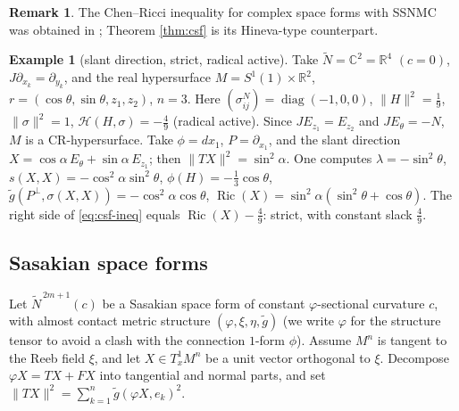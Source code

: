 \documentclass[11pt]{article}
\theoremstyle{definition}
\newtheorem{remark}[theorem]{Remark}
\newtheorem{example}[theorem]{Example}
\newcommand{\tN}{\widetilde{N}}
\newcommand{\tg}{\widetilde{g}}
\newcommand{\Ric}{\operatorname{Ric}}
\newcommand{\HH}{\mathcal{H}}
\begin{document}
\begin{remark}\label{rem:csf-hist}
The Chen--Ricci inequality for complex space forms with SSNMC was obtained in \cite{Moh1}; Theorem \ref{thm:csf} is its Hineva-type counterpart.
\end{remark}

\begin{example}[slant direction, strict, radical active]\label{ex:complex}
Take $\tN=\mathbb{C}^2=\mathbb{R}^4$ $(c=0)$, $J\partial_{x_k}=\partial_{y_k}$, and the real hypersurface $M=S^1(1)\times\mathbb{R}^2$, $r=(\cos\theta,\sin\theta,z_1,z_2)$, $n=3$. Here $(\sigma^N_{ij})=\operatorname{diag}(-1,0,0)$, $\|H\|^2=\tfrac19$, $\|\sigma\|^2=1$, $\HH(H,\sigma)=-\tfrac49$ (radical active). Since $JE_{z_1}=E_{z_2}$ and $JE_\theta=-N$, $M$ is a CR-hypersurface. Take $\phi=dx_1$, $P=\partial_{x_1}$, and the slant direction $X=\cos\alpha\,E_\theta+\sin\alpha\,E_{z_1}$; then $\|TX\|^2=\sin^2\alpha$. One computes $\lambda=-\sin^2\theta$, $s(X,X)=-\cos^2\alpha\sin^2\theta$, $\phi(H)=-\tfrac13\cos\theta$, $\tg(P^\perp,\sigma(X,X))=-\cos^2\alpha\cos\theta$, $\Ric(X)=\sin^2\alpha(\sin^2\theta+\cos\theta)$. The right side of \eqref{eq:csf-ineq} equals $\Ric(X)-\tfrac49$: strict, with constant slack $\tfrac49$.
\end{example}

\subsection{Sasakian space forms}

Let $\tN^{\,2m+1}(c)$ be a Sasakian space form of constant $\varphi$-sectional curvature $c$, with almost contact metric structure $(\varphi,\xi,\eta,\tg)$ (we write $\varphi$ for the structure tensor to avoid a clash with the connection $1$-form $\phi$). Assume $M^n$ is tangent to the Reeb field $\xi$, and let $X\in T^1_xM^n$ be a unit vector orthogonal to $\xi$. Decompose $\varphi X=TX+FX$ into tangential and normal parts, and set $\|TX\|^2=\sum_{k=1}^{n}\tg(\varphi X,e_k)^2$.
\end{document}
